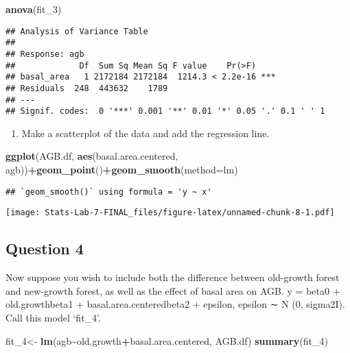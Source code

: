 \documentclass[
]{article}
\newenvironment{Shaded}{\begin{snugshade}}{\end{snugshade}}
\newcommand{\AttributeTok}[1]{\textcolor[rgb]{0.13,0.29,0.53}{#1}}
\newcommand{\FunctionTok}[1]{\textcolor[rgb]{0.13,0.29,0.53}{\textbf{#1}}}
\newcommand{\NormalTok}[1]{#1}
\newcommand{\OtherTok}[1]{\textcolor[rgb]{0.56,0.35,0.01}{#1}}
\newcommand{\SpecialCharTok}[1]{\textcolor[rgb]{0.81,0.36,0.00}{\textbf{#1}}}
\providecommand{\tightlist}{%
  \setlength{\itemsep}{0pt}\setlength{\parskip}{0pt}}
\begin{document}
\begin{Shaded}
\begin{Highlighting}[]
\FunctionTok{anova}\NormalTok{(fit\_3)}
\end{Highlighting}
\end{Shaded}

\begin{verbatim}
## Analysis of Variance Table
## 
## Response: agb
##             Df  Sum Sq Mean Sq F value    Pr(>F)    
## basal_area   1 2172184 2172184  1214.3 < 2.2e-16 ***
## Residuals  248  443632    1789                      
## ---
## Signif. codes:  0 '***' 0.001 '**' 0.01 '*' 0.05 '.' 0.1 ' ' 1
\end{verbatim}

\begin{enumerate}
\def\labelenumi{\alph{enumi}.}
\setcounter{enumi}{5}
\tightlist
\item
  Make a scatterplot of the data and add the regression line.
\end{enumerate}

\begin{Shaded}
\begin{Highlighting}[]
\FunctionTok{ggplot}\NormalTok{(AGB.df, }\FunctionTok{aes}\NormalTok{(basal.area.centered, agb))}\SpecialCharTok{+}\FunctionTok{geom\_point}\NormalTok{()}\SpecialCharTok{+}\FunctionTok{geom\_smooth}\NormalTok{(}\AttributeTok{method=}\NormalTok{lm)}
\end{Highlighting}
\end{Shaded}

\begin{verbatim}
## `geom_smooth()` using formula = 'y ~ x'
\end{verbatim}

\texttt{[image: Stats-Lab-7-FINAL\_files/figure-latex/unnamed-chunk-8-1.pdf]}

\hypertarget{question-4}{%
\subsection{Question 4}\label{question-4}}

Now suppose you wish to include both the difference between old-growth
forest and new-growth forest, as well as the effect of basal area on
AGB. y = beta0 + old.growthbeta1 + basal.area.centeredbeta2 + epsilon,
epsilon ∼ N (0, sigma2I). Call this model `fit\_4'.

\begin{Shaded}
\begin{Highlighting}[]
\NormalTok{fit\_4}\OtherTok{\textless{}{-}} \FunctionTok{lm}\NormalTok{(agb}\SpecialCharTok{\textasciitilde{}}\NormalTok{old.growth}\SpecialCharTok{+}\NormalTok{basal.area.centered, AGB.df)}
\FunctionTok{summary}\NormalTok{(fit\_4)}
\end{Highlighting}
\end{Shaded}
\end{document}
